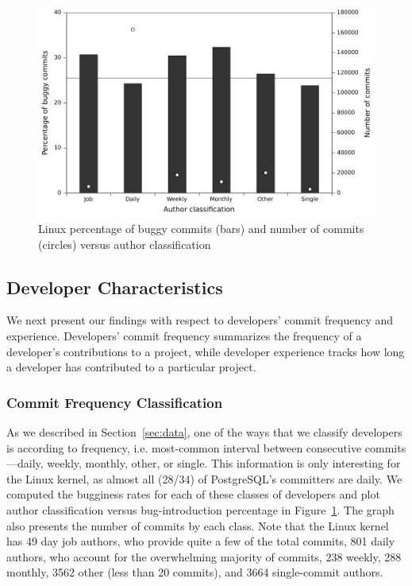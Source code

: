 \begin{figure}[t!hb]
\begin{center}
\includegraphics[width=\columnwidth]{linux-bugginess-author-class.pdf}
\end{center}
\caption{\label{fig-linux-bugginess-author-class}Linux percentage of buggy
 commits (bars) and number of commits (circles) versus author classification}
\end{figure}

\subsection{Developer Characteristics}
\label{sec-dev-char}

We next present our findings with respect to developers' commit frequency and
experience. Developers' commit frequency summarizes the frequency
of a developer's contributions to a project, while developer experience tracks
how long a developer has contributed to a particular project.

\subsubsection{Commit Frequency Classification} 

As we described in Section~\ref{sec:data}, one of the ways that we classify
developers is according to frequency, i.e. most-common interval between
consecutive commits---daily, weekly, monthly, other, or single. This
information is only interesting for the Linux kernel, as almost all (28/34) of
PostgreSQL's committers are daily. We computed the bugginess rates for each of
these classes of developers and plot author classification versus
bug-introduction percentage in
Figure~\ref{fig-linux-bugginess-author-class}. The graph also presents the
number of commits by each class. Note that the Linux kernel has 49 day job
authors, who provide quite a few of the total commits, 801 daily authors, who
account for the overwhelming majority of commits, 238 weekly, 288 monthly, 3562
other (less than 20 commits), and 3664 single-commit authors.

